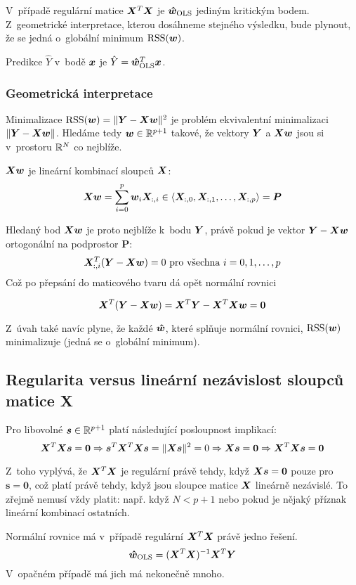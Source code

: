 V~případě regulární matice $\bm{X}^T\bm{X}$ je $\bm{\hat{w}}_{\text{OLS}}$ jediným kritickým bodem. Z~geometrické interpretace, kterou dosáhneme stejného výsledku, bude plynout, že se jedná o~globální minimum $\operatorname{RSS}(\bm{w})$.

Predikce $\hat{Y}$ v~bodě $\bm{x}$ je $\hat{Y} = \bm{\hat{w}}_{\text{OLS}}^T \bm{x}$.

\subsubsection{Geometrická interpretace}

Minimalizace $\operatorname{RSS}(\bm{w}) = \| \bm{Y} - \bm{X} \bm{w} \|^2$ je problém ekvivalentní minimalizaci ${\| \bm{Y} - \bm{X} \bm{w} \|}$. Hledáme tedy $\bm{w} \in \mathbb{R}^{p+1}$ takové, že vektory $\bm{Y}$ a $\bm{X}\bm{w}$ jsou si v~prostoru $\mathbb{R}^{N}$ co nejblíže.

$\bm{X}\bm{w}$ je lineární kombinací sloupců $\bm{X}$:
\[ \bm{X}\bm{w} = \sum_{i=0}^{p} \bm{w}_i \bm{X}_{:,i} \in \langle \bm{X}_{:,0}, \bm{X}_{:,1}, \ldots, \bm{X}_{:,p} \rangle = \bm{P} \]

Hledaný bod $\bm{X}\bm{w}$ je proto nejblíže k~bodu $\bm{Y}$, právě pokud je vektor $\bm{Y} - \bm{X}\bm{w}$ ortogonální na podprostor $\bm{P}$:
\[ \bm{X}_{:,i}^T(\bm{Y} - \bm{X}\bm{w}) = 0 \text{ pro všechna } i = 0, 1, \ldots, p \]
Což po přepsání do maticového tvaru dá opět normální rovnici

\[ \bm{X}^T(\bm{Y} - \bm{X}\bm{w}) = \bm{X}^T\bm{Y} - \bm{X}^T\bm{X}\bm{w} = \bm{0} \]

Z~úvah také navíc plyne, že každé $\bm{\hat{w}}$, které splňuje normální rovnici, $\operatorname{RSS}(\bm{w})$ minimalizuje (jedná se o~globální minimum).

\subsection{Regularita versus lineární nezávislost sloupců matice X}

Pro libovolné $\bm{s} \in \mathbb{R}^{p+1}$ platí následující posloupnost implikací:
\[
    \bm{X}^T\bm{X}\bm{s} = \mathbf{0}
    \Rightarrow \bm{s}^T\bm{X}^T\bm{X}\bm{s} = \|\bm{X}\bm{s}\|^2 = 0
    \Rightarrow \bm{X}\bm{s} = \bm{0}
    \Rightarrow \bm{X}^T\bm{X}\bm{s} = \mathbf{0}
\]

Z~toho vyplývá, že $\bm{X}^T\bm{X}$ je regulární právě tehdy, když $\bm{X}\bm{s} = \bm{0}$ pouze pro $\bm{s} = \bm{0}$, což platí právě tehdy, když jsou sloupce matice $\bm{X}$ lineárně nezávislé. To zřejmě nemusí vždy platit: např. když $N < p+1$ nebo pokud je nějaký příznak lineární kombinací ostatních.

Normální rovnice má v~případě regulární $\bm{X}^T \bm{X}$ právě jedno řešení.
\[ \bm{\hat{w}}_{\text{OLS}} = (\bm{X}^T \bm{X})^{-1} \bm{X}^T \bm{Y} \]
V~opačném případě má jich má nekonečně mnoho.

